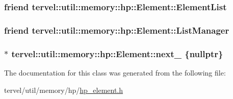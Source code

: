 \subsubsection[{Element\+List}]{\setlength{\rightskip}{0pt plus 5cm}friend tervel\+::util\+::memory\+::hp\+::\+Element\+::\+Element\+List\hspace{0.3cm}{\ttfamily [private]}}\label{classtervel_1_1util_1_1memory_1_1hp_1_1_element_abf4d1f696e870e12271bffb158ceb7c7}
\hypertarget{classtervel_1_1util_1_1memory_1_1hp_1_1_element_a2bede6af4da0ddbd5d5e12861432d670}{}
\subsubsection[{List\+Manager}]{\setlength{\rightskip}{0pt plus 5cm}friend tervel\+::util\+::memory\+::hp\+::\+Element\+::\+List\+Manager\hspace{0.3cm}{\ttfamily [private]}}\label{classtervel_1_1util_1_1memory_1_1hp_1_1_element_a2bede6af4da0ddbd5d5e12861432d670}
\hypertarget{classtervel_1_1util_1_1memory_1_1hp_1_1_element_a6a0fa344b7f35ea4db2381a54dfd6c8d}{}
\subsubsection[{next\+\_\+}]{$\ast$ tervel\+::util\+::memory\+::hp\+::\+Element\+::next\+\_\+ \{nullptr\}\hspace{0.3cm}{\ttfamily [private]}}\label{classtervel_1_1util_1_1memory_1_1hp_1_1_element_a6a0fa344b7f35ea4db2381a54dfd6c8d}


The documentation for this class was generated from the following file\+:\begin{DoxyCompactItemize}
\item 
tervel/util/memory/hp/\hyperlink{hp__element_8h}{hp\+\_\+element.\+h}\end{DoxyCompactItemize}
